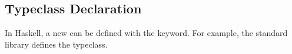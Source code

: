 \subsection{Typeclass Declaration}\label{subsec:Typeclass_Declaration}
In Haskell, a new  can be defined with the  keyword.
For example, the standard library defines the  typeclass.


